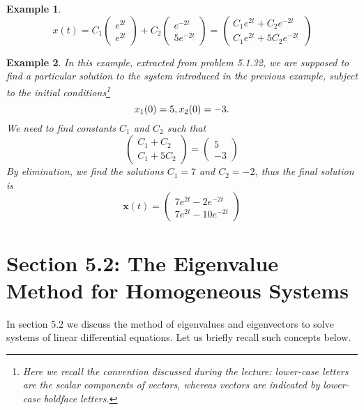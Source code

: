\documentclass[11pt]{amsart}
\newtheorem{example}{Example}
\numberwithin{equation}{section}
\begin{document}
\begin{example}
\begin{equation*}
x(t) = C_1\left(
\begin{matrix}
e^{2t} \\
e^{2t}
\end{matrix}
\right) + C_2\left(
\begin{matrix}
e^{-2t}\\
5e^{-2t}
\end{matrix}
\right)
= \left(
\begin{matrix}
C_1 e^{2t} + C_2e^{-2t} \\
C_1e^{2t}+5C_2e^{-2t}
\end{matrix}
\right)
\end{equation*}
\end{example}


\begin{example}
In this example, extracted from problem 5.1.32, we are supposed to find a particular solution to the system introduced in the previous example, subject to the initial conditions\footnote{Here we recall the convention discussed during the lecture: lower-case letters are the scalar components of vectors, whereas vectors are indicated by lower-case boldface letters.}
\begin{equation*}
x_1(0)  = 5, \\ x_2(0) = -3.
\end{equation*}
We need to find constants $C_1$ and $C_2$ such that 
\begin{equation*}
\left(
\begin{matrix}
C_1+C_2 \\
C_1+5C_2
\end{matrix}
\right) = \left(
\begin{matrix}
5 \\ 
-3
\end{matrix}
\right)
\end{equation*}
By elimination, we find the solutions $C_1=7$ and $C_2=-2$, thus the final solution is 
\begin{equation*}
\mathbf{x}(t) = \left(
\begin{matrix}
7e^{2t}-2e^{-2t}\\
7e^{2t}-10e^{-2t}
\end{matrix}
\right)
\end{equation*}
\end{example}

\section*{Section 5.2: The Eigenvalue Method for Homogeneous Systems}
In section 5.2 we discuss the method of eigenvalues and eigenvectors to solve systems of linear differential equations. Let us briefly recall such concepts below. 
\end{document}
